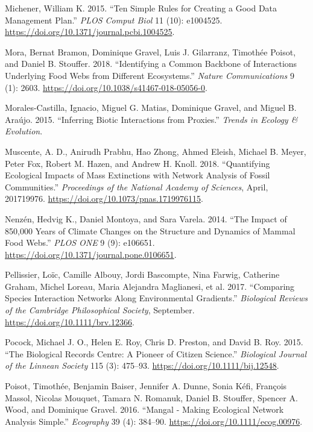 \documentclass[11pt]{article}
\begin{document}
\leavevmode\hypertarget{ref-Mich15}{}%
Michener, William K. 2015. ``Ten Simple Rules for Creating a Good Data
Management Plan.'' \emph{PLOS Comput Biol} 11 (10): e1004525.
\url{https://doi.org/10.1371/journal.pcbi.1004525}.

\leavevmode\hypertarget{ref-MoraGrav18}{}%
Mora, Bernat Bramon, Dominique Gravel, Luis J. Gilarranz, Timothée
Poisot, and Daniel B. Stouffer. 2018. ``Identifying a Common Backbone of
Interactions Underlying Food Webs from Different Ecosystems.''
\emph{Nature Communications} 9 (1): 2603.
\url{https://doi.org/10.1038/s41467-018-05056-0}.

\leavevmode\hypertarget{ref-MoraMati15}{}%
Morales-Castilla, Ignacio, Miguel G. Matias, Dominique Gravel, and
Miguel B. Araújo. 2015. ``Inferring Biotic Interactions from Proxies.''
\emph{Trends in Ecology \& Evolution}.

\leavevmode\hypertarget{ref-MuscPrab18}{}%
Muscente, A. D., Anirudh Prabhu, Hao Zhong, Ahmed Eleish, Michael B.
Meyer, Peter Fox, Robert M. Hazen, and Andrew H. Knoll. 2018.
``Quantifying Ecological Impacts of Mass Extinctions with Network
Analysis of Fossil Communities.'' \emph{Proceedings of the National
Academy of Sciences}, April, 201719976.
\url{https://doi.org/10.1073/pnas.1719976115}.

\leavevmode\hypertarget{ref-NenzMont14}{}%
Nenzén, Hedvig K., Daniel Montoya, and Sara Varela. 2014. ``The Impact
of 850,000 Years of Climate Changes on the Structure and Dynamics of
Mammal Food Webs.'' \emph{PLOS ONE} 9 (9): e106651.
\url{https://doi.org/10.1371/journal.pone.0106651}.

\leavevmode\hypertarget{ref-PellAlbo17}{}%
Pellissier, Loïc, Camille Albouy, Jordi Bascompte, Nina Farwig,
Catherine Graham, Michel Loreau, Maria Alejandra Maglianesi, et al.
2017. ``Comparing Species Interaction Networks Along Environmental
Gradients.'' \emph{Biological Reviews of the Cambridge Philosophical
Society}, September. \url{https://doi.org/10.1111/brv.12366}.

\leavevmode\hypertarget{ref-PocoRoy15}{}%
Pocock, Michael J. O., Helen E. Roy, Chris D. Preston, and David B. Roy.
2015. ``The Biological Records Centre: A Pioneer of Citizen Science.''
\emph{Biological Journal of the Linnean Society} 115 (3): 475--93.
\url{https://doi.org/10.1111/bij.12548}.

\leavevmode\hypertarget{ref-PoisBais16}{}%
Poisot, Timothée, Benjamin Baiser, Jennifer A. Dunne, Sonia Kéfi,
François Massol, Nicolas Mouquet, Tamara N. Romanuk, Daniel B. Stouffer,
Spencer A. Wood, and Dominique Gravel. 2016. ``Mangal - Making
Ecological Network Analysis Simple.'' \emph{Ecography} 39 (4): 384--90.
\url{https://doi.org/10.1111/ecog.00976}.
\end{document}
